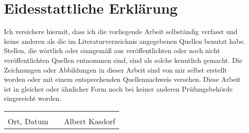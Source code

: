 %
%

%
%

\chapter*{Eidesstattliche Erklärung}

\thispagestyle{empty}


Ich versichere hiermit, dass ich die vorliegende Arbeit selbständig verfasst und keine anderen als die im Literaturverzeichnis angegebenen Quellen benutzt habe. Stellen, die wörtlich oder sinngemäß aus veröffentlichten oder noch nicht veröffentlichten Quellen entnommen sind, sind als solche kenntlich gemacht. Die Zeichnungen oder Abbildungen in dieser Arbeit sind von mir selbst erstellt worden oder mit einem entsprechenden Quellennachweis versehen. Diese Arbeit ist in gleicher oder ähnlicher Form noch bei keiner anderen Prüfungsbehörde eingereicht worden.

\vspace{2cm}

\begin{center}
	\begin{tabular}[h]{p{5.5cm}p{2cm}p{5.5cm}}
		& & \\
		\cline{1-1}\cline{3-3}
		Ort, Datum & & Albert Kasdorf \\
	\end{tabular}
\end{center}